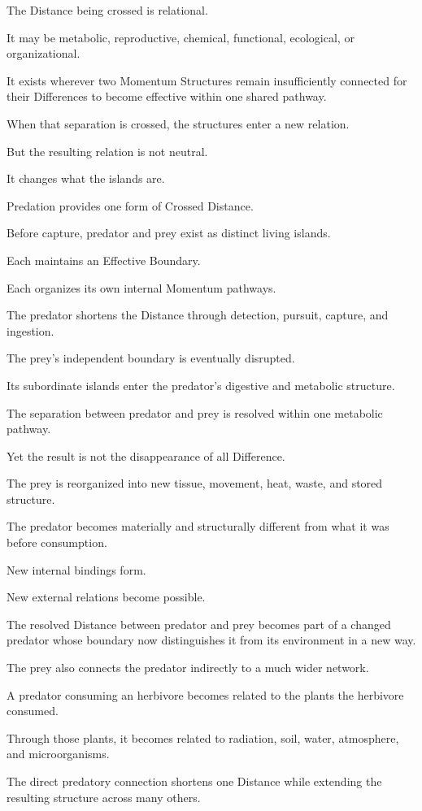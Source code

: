 The Distance being crossed is relational.

It may be metabolic, reproductive, chemical, functional, ecological, or organizational.

It exists wherever two Momentum Structures remain insufficiently connected for their Differences to become effective within one shared pathway.

When that separation is crossed, the structures enter a new relation.

But the resulting relation is not neutral.

It changes what the islands are.

Predation provides one form of Crossed Distance.

Before capture, predator and prey exist as distinct living islands.

Each maintains an Effective Boundary.

Each organizes its own internal Momentum pathways.

The predator shortens the Distance through detection, pursuit, capture, and ingestion.

The prey’s independent boundary is eventually disrupted.

Its subordinate islands enter the predator’s digestive and metabolic structure.

The separation between predator and prey is resolved within one metabolic pathway.

Yet the result is not the disappearance of all Difference.

The prey is reorganized into new tissue, movement, heat, waste, and stored structure.

The predator becomes materially and structurally different from what it was before consumption.

New internal bindings form.

New external relations become possible.

The resolved Distance between predator and prey becomes part of a changed predator whose boundary now distinguishes it from its environment in a new way.

The prey also connects the predator indirectly to a much wider network.

A predator consuming an herbivore becomes related to the plants the herbivore consumed.

Through those plants, it becomes related to radiation, soil, water, atmosphere, and microorganisms.

The direct predatory connection shortens one Distance while extending the resulting structure across many others.

